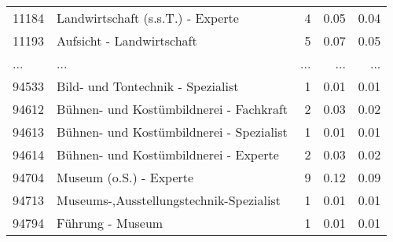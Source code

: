 \begin{longtable}{lXrrr}
        11184 & \multicolumn{1}{X}{Landwirtschaft (s.s.T.) - Experte} & %
          \num{4} &
          \num[round-mode=places,round-precision=2]{0,05} &
          \num[round-mode=places,round-precision=2]{0,04} \\
        11193 & \multicolumn{1}{X}{Aufsicht - Landwirtschaft} & %
          \num{5} &
          \num[round-mode=places,round-precision=2]{0,07} &
          \num[round-mode=places,round-precision=2]{0,05} \\
       ... & ... & ... & ... & ... \\
        94533 & \multicolumn{1}{X}{Bild- und Tontechnik - Spezialist} & %
          \num{1} &
          \num[round-mode=places,round-precision=2]{0,01} &
          \num[round-mode=places,round-precision=2]{0,01} \\

        94612 & \multicolumn{1}{X}{Bühnen- und Kostümbildnerei - Fachkraft} & %
          \num{2} &
          \num[round-mode=places,round-precision=2]{0,03} &
          \num[round-mode=places,round-precision=2]{0,02} \\

        94613 & \multicolumn{1}{X}{Bühnen- und Kostümbildnerei - Spezialist} & %
          \num{1} &
          \num[round-mode=places,round-precision=2]{0,01} &
          \num[round-mode=places,round-precision=2]{0,01} \\

        94614 & \multicolumn{1}{X}{Bühnen- und Kostümbildnerei - Experte} & %
          \num{2} &
          \num[round-mode=places,round-precision=2]{0,03} &
          \num[round-mode=places,round-precision=2]{0,02} \\

        94704 & \multicolumn{1}{X}{Museum (o.S.) - Experte} & %
          \num{9} &
          \num[round-mode=places,round-precision=2]{0,12} &
          \num[round-mode=places,round-precision=2]{0,09} \\

        94713 & \multicolumn{1}{X}{Museums-,Ausstellungstechnik-Spezialist} & %
          \num{1} &
          \num[round-mode=places,round-precision=2]{0,01} &
          \num[round-mode=places,round-precision=2]{0,01} \\

        94794 & \multicolumn{1}{X}{Führung - Museum} & %
          \num{1} &
          \num[round-mode=places,round-precision=2]{0,01} &
          \num[round-mode=places,round-precision=2]{0,01} \\


\end{longtable}
